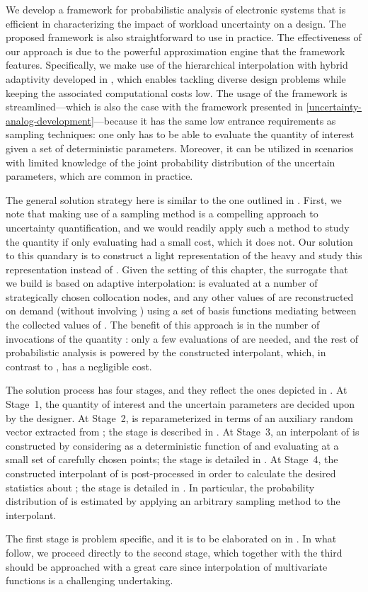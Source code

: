 We develop a framework for probabilistic analysis of electronic systems that is
efficient in characterizing the impact of workload uncertainty on a design. The
proposed framework is also straightforward to use in practice. The effectiveness
of our approach is due to the powerful approximation engine that the framework
features. Specifically, we make use of the hierarchical interpolation with
hybrid adaptivity developed in \cite{klimke2006, ma2009, jakeman2012}, which
enables tackling diverse design problems while keeping the associated
computational costs low. The usage of the framework is streamlined---which is
also the case with the framework presented in
\cref{uncertainty-analog-development}---because it has the same low entrance
requirements as sampling techniques: one only has to be able to evaluate the
quantity of interest given a set of deterministic parameters. Moreover, it can
be utilized in scenarios with limited knowledge of the joint probability
distribution of the uncertain parameters, which are common in practice.

The general solution strategy here is similar to the one outlined in
. First, we note that making use of a sampling method is a
compelling approach to uncertainty quantification, and we would readily apply
such a method to study the quantity \g if only evaluating \g had a small cost,
which it does not. Our solution to this quandary is to construct a light
representation of the heavy \g and study this representation instead of \g.
Given the setting of this chapter, the surrogate that we build is based on
adaptive interpolation: \g is evaluated at a number of strategically chosen
collocation nodes, and any other values of \g are reconstructed on demand
(without involving \g) using a set of basis functions mediating between the
collected values of \g. The benefit of this approach is in the number of
invocations of the quantity \g: only a few evaluations of \g are needed, and the
rest of probabilistic analysis is powered by the constructed interpolant, which,
in contrast to \g, has a negligible cost.

The solution process has four stages, and they reflect the ones depicted in
. At Stage~1, the quantity of interest \g and the uncertain
parameters \vu are decided upon by the designer. At Stage~2, \g is
reparameterized in terms of an auxiliary random vector \vz extracted from \vu;
the stage is described in . At Stage~3, an
interpolant of \g is constructed by considering \g as a deterministic function
of \vz and evaluating \g at a small set of carefully chosen points; the stage is
detailed in . At Stage~4, the constructed interpolant
of \g is post-processed in order to calculate the desired statistics about \g;
the stage is detailed in . In particular, the probability
distribution of \g is estimated by applying an arbitrary sampling method to the
interpolant.

The first stage is problem specific, and it is to be elaborated on in
. In what follow, we proceed directly to the second
stage, which together with the third should be approached with a great care
since interpolation of multivariate functions is a challenging undertaking.
